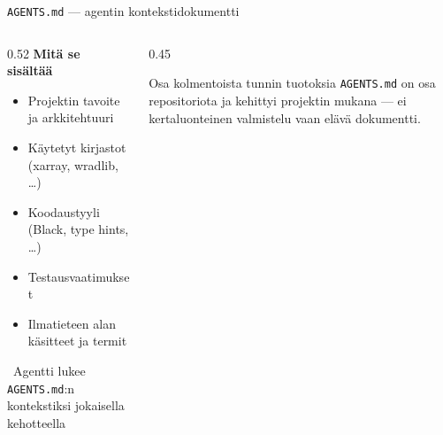\documentclass[aspectratio=169]{beamer}
\begin{document}
\begin{frame}{\texttt{AGENTS.md} — agentin kontekstidokumentti}
  \begin{columns}
    \begin{column}{0.52\textwidth}
      \textbf{Mitä se sisältää}
      \begin{itemize}
        \item Projektin tavoite ja arkkitehtuuri
        \item Käytetyt kirjastot (xarray, wradlib, \ldots)
        \item Koodaustyyli (Black, type hints, \ldots)
        \item Testausvaatimukset
        \item Ilmatieteen alan käsitteet ja termit
      \end{itemize}
      \vspace{0.5em}
      \begin{exampleblock}{}
        \small
        \faLightbulb\ Agentti lukee \texttt{AGENTS.md}:n kontekstiksi jokaisella kehotteella
      \end{exampleblock}
    \end{column}
    \begin{column}{0.45\textwidth}
      \begin{block}{Osa kolmentoista tunnin tuotoksia}
        \small
        \texttt{AGENTS.md} on osa repositoriota ja
        kehittyi projektin mukana — ei kertaluonteinen valmistelu
        vaan elävä dokumentti.\\[0.5em]
      \end{block}
    \end{column}
  \end{columns}
\end{frame}
\end{document}
